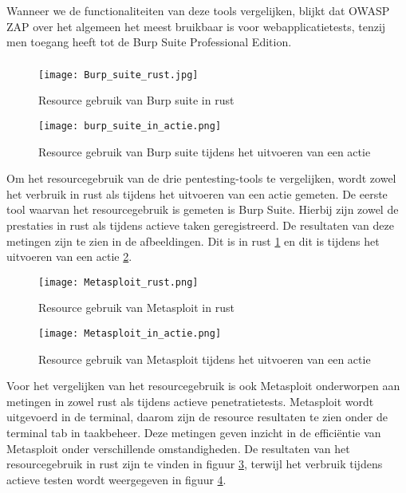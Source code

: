 Wanneer we de functionaliteiten van deze tools vergelijken, blijkt dat OWASP ZAP over het algemeen het meest bruikbaar is voor 
webapplicatietests, tenzij men toegang heeft tot de Burp Suite Professional Edition.
\subsubsection{}
\begin{figure}
    \centering
    \texttt{[image: Burp\_suite\_rust.jpg]}
    \caption[Resource gebruik van Burp suite in rust]{Resource gebruik van Burp suite in rust}
    \label{fig:burp_suite_rust}
\end{figure}
\begin{figure}
    \centering
    \texttt{[image: burp\_suite\_in\_actie.png]}
    \caption[Resource gebruik van Burp suite tijdens het uitvoeren van een actie]{Resource gebruik van Burp suite tijdens het uitvoeren van een actie}
    \label{fig:burp_suite_actie}
\end{figure}
Om het resourcegebruik van de drie pentesting-tools te vergelijken, wordt zowel het verbruik in rust als tijdens het 
uitvoeren van een actie gemeten. De eerste tool waarvan het resourcegebruik is gemeten is Burp Suite. Hierbij zijn zowel de 
prestaties in rust als tijdens actieve taken geregistreerd. De resultaten van deze metingen zijn te zien in de afbeeldingen. 
Dit is in rust \ref{fig:burp_suite_rust} en dit is tijdens het uitvoeren van een actie \ref{fig:burp_suite_actie}. 

\begin{figure}
    \centering
    \texttt{[image: Metasploit\_rust.png]}
    \caption[Resource gebruik van Metasploit in rust]{Resource gebruik van Metasploit in rust}
    \label{fig:metasploit_rust}
\end{figure}
\begin{figure}
    \centering
    \texttt{[image: Metasploit\_in\_actie.png]}
    \caption[Resource gebruik van Metasploit tijdens het uitvoeren van een actie]{Resource gebruik van Metasploit tijdens het uitvoeren van een actie}
    \label{fig:metasploit_actie}
\end{figure}
Voor het vergelijken van het resourcegebruik is ook Metasploit onderworpen aan metingen in zowel rust als tijdens actieve 
penetratietests. Metasploit wordt uitgevoerd in de terminal, daarom zijn de resource resultaten te zien onder de terminal tab 
in taakbeheer. Deze metingen geven inzicht in de efficiëntie van Metasploit onder verschillende omstandigheden. De 
resultaten van het resourcegebruik in rust zijn te vinden in figuur \ref{fig:metasploit_rust}, terwijl het verbruik tijdens 
actieve testen wordt weergegeven in figuur \ref{fig:metasploit_actie}.

